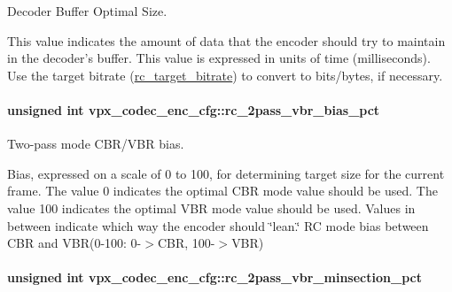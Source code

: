 \-Decoder \-Buffer \-Optimal \-Size. 

\-This value indicates the amount of data that the encoder should try to maintain in the decoder's buffer. \-This value is expressed in units of time (milliseconds). \-Use the target bitrate (\hyperlink{structvpx__codec__enc__cfg_ab8339685175d66710f482706cc9f0aed}{rc\-\_\-target\-\_\-bitrate}) to convert to bits/bytes, if necessary. \hypertarget{structvpx__codec__enc__cfg_a21c21ff097890dc3a450731c9b504cf4}{
\paragraph[{rc\-\_\-2pass\-\_\-vbr\-\_\-bias\-\_\-pct}]{\setlength{\rightskip}{0pt plus 5cm}unsigned int {\bf vpx\-\_\-codec\-\_\-enc\-\_\-cfg\-::rc\-\_\-2pass\-\_\-vbr\-\_\-bias\-\_\-pct}}}\label{structvpx__codec__enc__cfg_a21c21ff097890dc3a450731c9b504cf4}


\-Two-\/pass mode \-C\-B\-R/\-V\-B\-R bias. 

\-Bias, expressed on a scale of 0 to 100, for determining target size for the current frame. \-The value 0 indicates the optimal \-C\-B\-R mode value should be used. \-The value 100 indicates the optimal \-V\-B\-R mode value should be used. \-Values in between indicate which way the encoder should \char`\"{}lean.\char`\"{} \-R\-C mode bias between \-C\-B\-R and \-V\-B\-R(0-\/100\-: 0-\/$>$\-C\-B\-R, 100-\/$>$\-V\-B\-R) \hypertarget{structvpx__codec__enc__cfg_a21eb9fce0844ae07b617bf3f0a25f5a5}{
\paragraph[{rc\-\_\-2pass\-\_\-vbr\-\_\-minsection\-\_\-pct}]{\setlength{\rightskip}{0pt plus 5cm}unsigned int {\bf vpx\-\_\-codec\-\_\-enc\-\_\-cfg\-::rc\-\_\-2pass\-\_\-vbr\-\_\-minsection\-\_\-pct}}}\label{structvpx__codec__enc__cfg_a21eb9fce0844ae07b617bf3f0a25f5a5}


